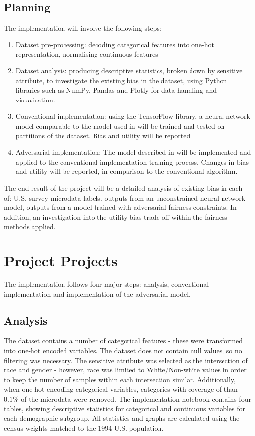 \documentclass[conference]{IEEEtran}
\begin{document}
\subsection{Planning}
The implementation will involve the following steps:
\begin{enumerate}
    \item Dataset pre-processing: decoding categorical features into one-hot representation, normalising continuous features.
    \item Dataset analysis: producing descriptive statistics, broken down by sensitive attribute, to investigate the existing bias in the dataset, using Python libraries such as NumPy, Pandas and Plotly for data handling and visualisation.
    \item Conventional implementation: using the TensorFlow\cite{tensorflow2015-whitepaper} library, a neural network model comparable to the model used in \cite{Adel_Valera_Ghahramani_Weller_2019} will be trained and tested on partitions of the dataset. Bias and utility will be reported.
    \item Adversarial implementation: The model described in \cite{Adel_Valera_Ghahramani_Weller_2019} will be implemented and applied to the conventional implementation training process. Changes in bias and utility will be reported, in comparison to the conventional algorithm.
\end{enumerate}
The end result of the project will be a detailed analysis of existing bias in each of: U.S. survey microdata labels, outputs from an unconstrained neural network model, outputs from a model trained with adversarial fairness constraints. In addition, an investigation into the utility-bias trade-off within the fairness methods applied.
\section{Project Projects}
The implementation follows four major steps: analysis, conventional implementation and implementation of the adversarial model.
\subsection{Analysis}
The dataset contains a number of categorical features - these were transformed into one-hot encoded variables. The dataset does not contain null values, so no filtering was necessary. The sensitive attribute was selected as the intersection of race and gender - however, race was limited to White/Non-white values in order to keep the number of samples within each intersection similar. Additionally, when one-hot encoding categorical variables, categories with coverage of than $0.1\%$ of the microdata were removed. The implementation notebook contains four tables, showing descriptive statistics for categorical and continuous variables for each demographic subgroup. All statistics and graphs are calculated using the census weights matched to the $1994$ U.S. population.
\end{document}
